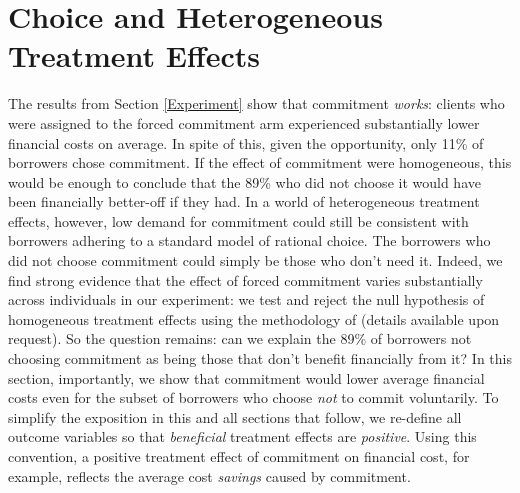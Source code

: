 \documentclass[12pt, a4paper]{article}
\begin{document}



\section{Choice and Heterogeneous Treatment Effects}
\label{Choice}

The results from Section \ref{Experiment} show that commitment \emph{works}: clients who were assigned to the forced commitment arm experienced substantially lower financial costs on average.
In spite of this, given the opportunity, only 11\% of borrowers chose commitment. 
If the effect of commitment were homogeneous, this would be enough to conclude that the 89\% who did not choose it would have been financially better-off if they had.
In a world of heterogeneous treatment effects, however, low demand for commitment could still be consistent with borrowers adhering to a standard model of rational choice. 
The borrowers who did not choose commitment could simply be those who don't need it. 
Indeed, we find strong evidence that the effect of forced commitment varies substantially across individuals in our experiment: we test and reject
the null hypothesis of homogeneous treatment effects using the methodology of \cite{chernozhukov2018generic} (details available upon request).
So the question remains: can we explain the 89\% of borrowers not choosing commitment as being those that don't benefit financially from it?  
In this section, importantly, we show that commitment would lower average financial costs even for the subset of borrowers who choose \emph{not} to commit voluntarily.
To simplify the exposition in this and all sections that follow, we re-define all outcome variables so that \emph{beneficial} treatment effects are \emph{positive}. Using this convention, a positive treatment effect of commitment on financial cost, for example, reflects the average cost \emph{savings} caused by commitment.
\end{document}
